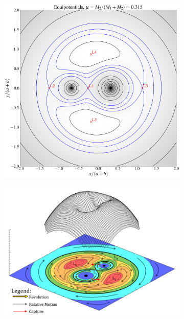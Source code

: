 \documentclass[main.tex]{subfiles}
\begin{document}
    \begin{figure}[t!]
        \centering
        \begin{subfigure}{0.45\textwidth}
            \centering
             \includegraphics[width=\columnwidth]{figures/chapter1/equipotentials_mu_0.315.png} 
        \end{subfigure}
        \begin{subfigure}{0.535\textwidth}
            \centering
            \includegraphics[width=\columnwidth]{figures/chapter1/RochePotentialColorized.png} 

\end{subfigure}
\end{figure}
\end{document}
